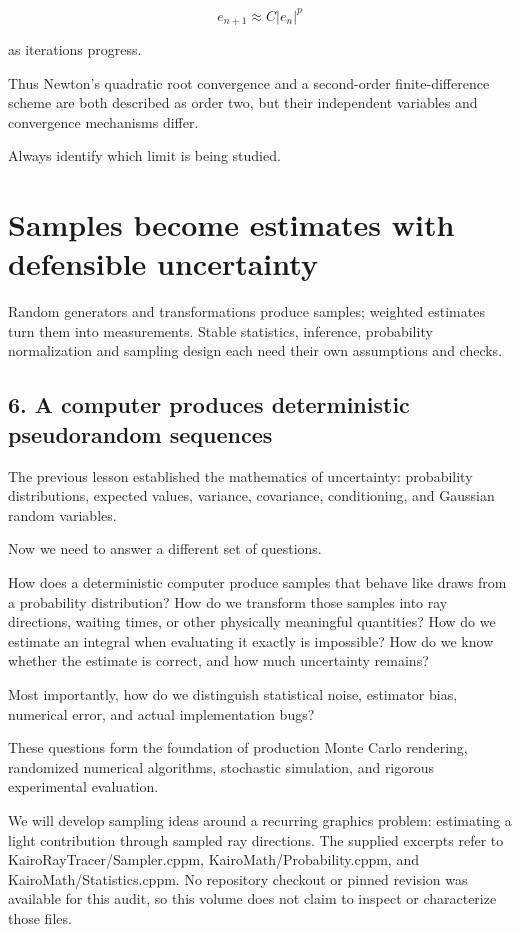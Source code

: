 \[ e_{n+1}\approx C|e_n|^p \]

as iterations progress.

Thus Newton's quadratic root convergence and a second-order finite-difference scheme are both described as order two, but their independent variables and convergence mechanisms differ.

Always identify which limit is being studied.

\section{Samples become estimates with defensible uncertainty}\label{samples-become-estimates-with-defensible-uncertainty}

Random generators and transformations produce samples; weighted estimates turn them into measurements. Stable statistics, inference, probability normalization and sampling design each need their own assumptions and checks.

\subsection{6. A computer produces deterministic pseudorandom sequences}\label{a-computer-produces-deterministic-pseudorandom-sequences}

The previous lesson established the mathematics of uncertainty: probability distributions, expected values, variance, covariance, conditioning, and Gaussian random variables.

Now we need to answer a different set of questions.

How does a deterministic computer produce samples that behave like draws from a probability distribution? How do we transform those samples into ray directions, waiting times, or other physically meaningful quantities? How do we estimate an integral when evaluating it exactly is impossible? How do we know whether the estimate is correct, and how much uncertainty remains?

Most importantly, how do we distinguish statistical noise, estimator bias, numerical error, and actual implementation bugs?

These questions form the foundation of production Monte Carlo rendering, randomized numerical algorithms, stochastic simulation, and rigorous experimental evaluation.

We will develop sampling ideas around a recurring graphics problem: estimating a light contribution through sampled ray directions. The supplied excerpts refer to KairoRayTracer/Sampler.cppm, KairoMath/Probability.cppm, and KairoMath/Statistics.cppm. No repository checkout or pinned revision was available for this audit, so this volume does not claim to inspect or characterize those files.

